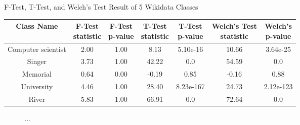 \begin{center}
\small
\begin{threeparttable}
\caption{F-Test, T-Test, and Welch's Test Result of 5 Wikidata Classes}
\label{tab:western - mean test}
\begin{tabular}{c c c c c c c} 
\toprule
    Class Name & \CellWithForceBreak{F-Test \\ statistic} & \CellWithForceBreak{F-Test \\ p-value} & \CellWithForceBreak{T-Test \\ statistic} & \CellWithForceBreak{T-Test \\ p-value} & \CellWithForceBreak{Welch's Test \\ statistic} & \CellWithForceBreak{Welch's \\ p-value} \\ [0.5ex] 
\midrule
    Computer scientist & 2.00 & 1.00 & 8.13 & 5.10e-16 & 10.66 & 3.64e-25 \\
    Singer & 3.73 & 1.00 & 42.22 & 0.0 & 54.59 & 0.0 \\
    Memorial & 0.64 & 0.00 & -0.19 & 0.85 & -0.16 & 0.88 \\
    University & 4.46 & 1.00 & 28.40 & 8.23e-167 & 24.73 & 2.12e-123 \\
    River & 5.83 & 1.00 & 66.91 & 0.0 & 72.64 & 0.0 \\
 [1ex]
\bottomrule
\end{tabular}
\begin{tablenotes}
    \footnotesize
\end{tablenotes}
\end{threeparttable}
\end{center}

\begin{figure}[htp]
\centering 
{}


\caption{...}
\label{fig:western - ratio of regional wealth to expectation}

\end{figure}